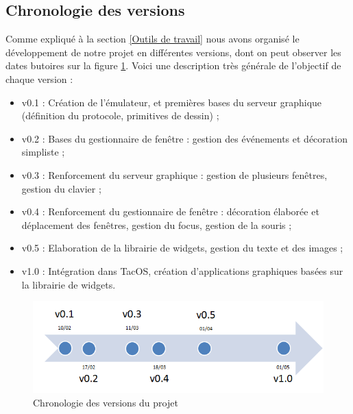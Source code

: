 \subsection{Chronologie des versions}
Comme expliqué à la section \ref{Outils de travail} nous avons organisé le développement de notre projet en différentes versions, dont on peut observer les dates butoires sur la figure \ref{fig:chrono}. Voici une description très générale de l'objectif de chaque version :
\begin{itemize}
\renewcommand{\labelitemi}{$\bullet$}
\item v0.1 : Création de l'émulateur, et premières bases du serveur graphique (définition du protocole, primitives de dessin) ;
\item v0.2 : Bases du gestionnaire de fenêtre : gestion des événements et décoration simpliste ;
\item v0.3 : Renforcement du serveur graphique : gestion de plusieurs fenêtres, gestion du clavier ;
\item v0.4 : Renforcement du gestionnaire de fenêtre : décoration élaborée et déplacement des fenêtres, gestion du focus, gestion de la souris ;
\item v0.5 : Elaboration de la librairie de widgets, gestion du texte et des images ;
\item v1.0 : Intégration dans TacOS, création d'applications graphiques basées sur la librairie de widgets.
\end{itemize}


\begin{figure}[H]
  \centering
    \includegraphics[width=15cm]{figures/chrono}
  \caption{\label{fig:chrono}Chronologie des versions du projet}
\end{figure}

